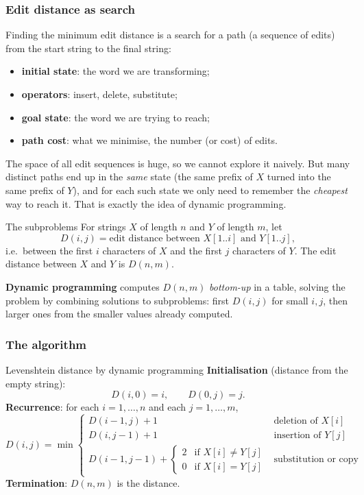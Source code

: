 \subsubsection{Edit distance as search}

Finding the minimum edit distance is a search for a path (a sequence of edits) from the
start string to the final string:
\begin{itemize}[nosep]
  \item \textbf{initial state}: the word we are transforming;
  \item \textbf{operators}: insert, delete, substitute;
  \item \textbf{goal state}: the word we are trying to reach;
  \item \textbf{path cost}: what we minimise, the number (or cost) of edits.
\end{itemize}
The space of all edit sequences is huge, so we cannot explore it naively. But many
distinct paths end up in the \emph{same} state (the same prefix of $X$ turned into the
same prefix of $Y$), and for each such state we only need to remember the
\emph{cheapest} way to reach it. That is exactly the idea of dynamic programming.

\begin{nbdef}{The subproblems}
For strings $X$ of length $n$ and $Y$ of length $m$, let
\[
  D(i, j) = \text{edit distance between } X[1..i] \text{ and } Y[1..j],
\]
i.e.\ between the first $i$ characters of $X$ and the first $j$ characters of $Y$. The
edit distance between $X$ and $Y$ is $D(n, m)$.
\end{nbdef}

\textbf{Dynamic programming} computes $D(n,m)$ \emph{bottom-up} in a table, solving the
problem by combining solutions to subproblems: first $D(i,j)$ for small $i, j$, then
larger ones from the smaller values already computed.

\subsubsection{The algorithm}

\begin{nbfact}{Levenshtein distance by dynamic programming}
\textbf{Initialisation} (distance from the empty string):
\[ D(i, 0) = i, \qquad D(0, j) = j. \]
\textbf{Recurrence}: for each $i = 1, \dots, n$ and each $j = 1, \dots, m$,
\[
  D(i,j) = \min \begin{cases}
     D(i-1, j) + 1 & \text{deletion of } X[i]\\
     D(i, j-1) + 1 & \text{insertion of } Y[j]\\
     D(i-1, j-1) + \begin{cases} 2 & \text{if } X[i] \neq Y[j]\\ 0 & \text{if } X[i] = Y[j]\end{cases}
       & \text{substitution or copy}
  \end{cases}
\]
\textbf{Termination}: $D(n, m)$ is the distance.
\end{nbfact}

